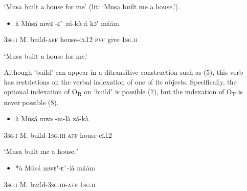 \documentclass[output=paper]{langsci/langscibook}
\begin{document}
\begin{styleTranslation}
‘Musa built a house for me’ (lit: ‘Musa built me a house.’). 
\end{styleTranslation}

\begin{itemize}
\item \begin{styleNumberedEX}
\label{bkm:Ref446636188}\`{a}    M\'{u}s\'{a}  mwɛ\'{ }-ɛ\`{ }    z\'{a}-k\`{a}    \'{n}  kɔ\'{ }  m\'{a}\'{a}m
\end{styleNumberedEX}\end{itemize}
\begin{styleGloss}
\textsc{3sg.i  }  M.  build-\textsc{aff}  house\textsc{{}-cl12}  \textsc{pvc}  give  \textsc{1sg.ii}
\end{styleGloss}

\begin{styleTranslation}
‘Musa built a house for me.’
\end{styleTranslation}

Although ‘build’ can appear in a ditransitive construction such as (5), this verb has restrictions on the verbal indexation of one of its objects. Specifically, the optional indexation of O\textsubscript{R} on ‘buildʼ is possible (7), but the indexation of O\textsubscript{T} is never possible (8).

\begin{itemize}
\item \begin{styleNumberedEX}
\label{bkm:Ref446636228}\`{a}    M\'{u}s\'{a}  mwɛ\'{ }-m-l\`{a}    z\'{a}-k\`{a}
\end{styleNumberedEX}\end{itemize}
\begin{styleGloss}
\textsc{3sg.i  }  M.  build-\textsc{1sg.iii-aff}  house-c\textsc{l12}
\end{styleGloss}

\begin{styleTranslation}
‘Musa built me a house.ʼ
\end{styleTranslation}

\begin{itemize}
\item \begin{styleNumberedEX}
\label{bkm:Ref446636239}*\`{a}    M\'{u}s\'{a}  mwɛ\'{ }-ɛ\`{ }-l\`{a}    m\'{a}\'{a}m
\end{styleNumberedEX}\end{itemize}
\begin{styleGloss}
\textsc{3sg.i  }  M.  build-\textsc{3sg.iii-aff}  \textsc{1sg.ii}
\end{styleGloss}
\end{document}
